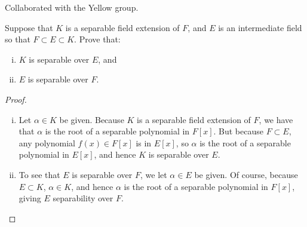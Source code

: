 \documentclass[num=9,duedate=04-07-21,course=Algebra\ II,proflastname=Walton]{hwtemplate}
\begin{document}

% 

\maketitle

Collaborated with the Yellow group.

\pagebreak
\problem[1]
\begin{claim}
	Suppose that \(K\) is a separable field extension of \(F\), and \(E\) is an intermediate field so that \(F\subset E\subset K\). Prove that:
	\begin{enumerate}[(i).]
		\item \(K\) is separable over \(E\), and
		\item \(E\) is separable over \(F\).
	\end{enumerate}
\end{claim}

\begin{proof}
	\begin{enumerate}[(i).]
		\item Let \(\alpha  \in K\) be given. Because \(K\) is a separable field extension of \(F\), we have that \(\alpha \) is the root of a separable polynomial in \(F[x]\). But because \(F\subset E\), any polynomial \(f(x) \in F[x]\) is in \(E[x]\), so \(\alpha \) is the root of a separable polynomial in \(E[x]\), and hence \(K\) is separable over \(E\).
		\item To see that \(E\) is separable over \(F\), we let \(\alpha  \in E\) be given. Of course, because \(E\subset K\), \(\alpha  \in K\), and hence \(\alpha \) is the root of a separable polynomial in \(F[x]\), giving \(E\) separability over \(F\).
\end{enumerate}
\end{proof}
\end{document}
